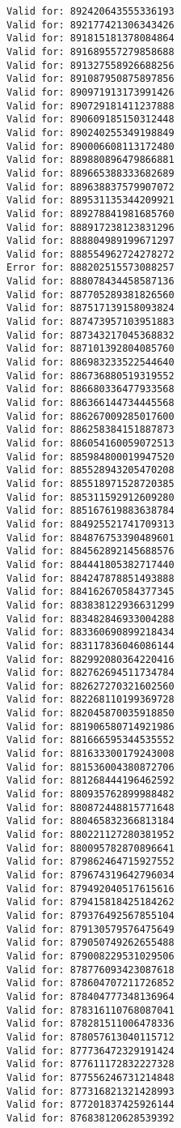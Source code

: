 \documentclass[11pt]{article}
\begin{document}
    \begin{Verbatim}[commandchars=\\\{\}]
Valid for: 892420643555336193
Valid for: 892177421306343426
Valid for: 891815181378084864
Valid for: 891689557279858688
Valid for: 891327558926688256
Valid for: 891087950875897856
Valid for: 890971913173991426
Valid for: 890729181411237888
Valid for: 890609185150312448
Valid for: 890240255349198849
Valid for: 890006608113172480
Valid for: 889880896479866881
Valid for: 889665388333682689
Valid for: 889638837579907072
Valid for: 889531135344209921
Valid for: 889278841981685760
Valid for: 888917238123831296
Valid for: 888804989199671297
Valid for: 888554962724278272
Error for: 888202515573088257
Valid for: 888078434458587136
Valid for: 887705289381826560
Valid for: 887517139158093824
Valid for: 887473957103951883
Valid for: 887343217045368832
Valid for: 887101392804085760
Valid for: 886983233522544640
Valid for: 886736880519319552
Valid for: 886680336477933568
Valid for: 886366144734445568
Valid for: 886267009285017600
Valid for: 886258384151887873
Valid for: 886054160059072513
Valid for: 885984800019947520
Valid for: 885528943205470208
Valid for: 885518971528720385
Valid for: 885311592912609280
Valid for: 885167619883638784
Valid for: 884925521741709313
Valid for: 884876753390489601
Valid for: 884562892145688576
Valid for: 884441805382717440
Valid for: 884247878851493888
Valid for: 884162670584377345
Valid for: 883838122936631299
Valid for: 883482846933004288
Valid for: 883360690899218434
Valid for: 883117836046086144
Valid for: 882992080364220416
Valid for: 882762694511734784
Valid for: 882627270321602560
Valid for: 882268110199369728
Valid for: 882045870035918850
Valid for: 881906580714921986
Valid for: 881666595344535552
Valid for: 881633300179243008
Valid for: 881536004380872706
Valid for: 881268444196462592
Valid for: 880935762899988482
Valid for: 880872448815771648
Valid for: 880465832366813184
Valid for: 880221127280381952
Valid for: 880095782870896641
Valid for: 879862464715927552
Valid for: 879674319642796034
Valid for: 879492040517615616
Valid for: 879415818425184262
Valid for: 879376492567855104
Valid for: 879130579576475649
Valid for: 879050749262655488
Valid for: 879008229531029506
Valid for: 878776093423087618
Valid for: 878604707211726852
Valid for: 878404777348136964
Valid for: 878316110768087041
Valid for: 878281511006478336
Valid for: 878057613040115712
Valid for: 877736472329191424
Valid for: 877611172832227328
Valid for: 877556246731214848
Valid for: 877316821321428993
Valid for: 877201837425926144
Valid for: 876838120628539392

\end{Verbatim}
\end{document}
